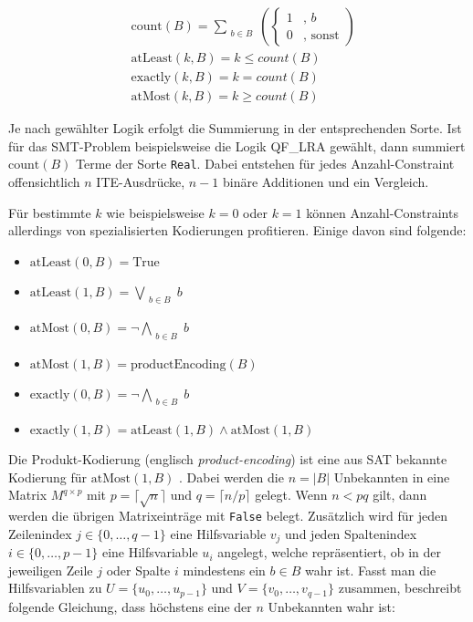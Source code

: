 \[
    \begin{aligned}
        & \text{count}(B) = \sum_{\substack{b \in B}}
            \left(
                \begin{cases}
                    1 & \text{, } b \\
                    0 & \text{, sonst}
                \end{cases}
            \right) \\[5pt]
        & \text{atLeast}(k, B) = k \leq count(B) \\[5pt]
        & \text{exactly}(k, B) = k = count(B) \\[5pt]
        & \text{atMost}(k, B) = k \geq count(B)
    \end{aligned}
\]

Je nach gewählter Logik erfolgt die Summierung in der entsprechenden Sorte.
Ist für das SMT-Problem beispielsweise die Logik QF\_LRA gewählt, dann summiert $\text{count}(B)$ Terme der Sorte \texttt{Real}.
Dabei entstehen für jedes Anzahl-Constraint offensichtlich $n$ ITE-Ausdrücke, $n-1$ binäre Additionen und ein Vergleich.

Für bestimmte $k$ wie beispielsweise $k = 0$ oder $k = 1$ können Anzahl-Constraints allerdings von spezialisierten Kodierungen profitieren.
Einige davon sind folgende:
\begin{itemize}
    \item $\text{atLeast}(0,B) = \text{True}$
    \item $\text{atLeast}(1,B) = \bigvee\limits_{\substack{b \in B}} b $
    \item $\text{atMost}(0,B) = \neg\bigwedge\limits_{\substack{b \in B}} b$
    \item $\text{atMost}(1,B) = \text{productEncoding}(B)$
    \item $\text{exactly}(0,B) = \neg\bigwedge\limits_{\substack{b \in B}} b$
    \item $\text{exactly}(1,B) = \text{atLeast}(1,B) \land \text{atMost}(1,B)$
\end{itemize}

Die Produkt-Kodierung (englisch \textit{product-encoding}) ist eine aus SAT bekannte Kodierung für $\text{atMost}(1,B)$ \cite{amoChen}.
Dabei werden die $n = \lvert B \rvert$ Unbekannten in eine Matrix $M^{q \times p}$ mit $p = \lceil \sqrt {n} \rceil$ und $q = \lceil n/p \rceil$ gelegt.
Wenn $n < pq$ gilt, dann werden die übrigen Matrixeinträge mit \texttt{False} belegt.
Zusätzlich wird für jeden Zeilenindex $j \in \{0,\ldots,q-1\}$ eine Hilfsvariable $v_j$ und jeden Spaltenindex $i \in \{0,\ldots,p-1\}$ eine Hilfsvariable $u_i$ angelegt,
welche repräsentiert, ob in der jeweiligen Zeile $j$ oder Spalte $i$ mindestens ein $b \in B$ wahr ist.
Fasst man die Hilfsvariablen zu $U = \{ u_0,\ldots, u_{p-1} \}$ und $V = \{ v_0,\ldots, v_{q-1} \}$ zusammen, beschreibt folgende Gleichung,
dass höchstens eine der $n$ Unbekannten wahr ist:

